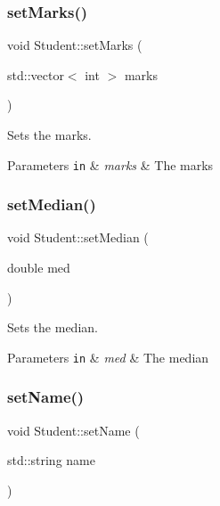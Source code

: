 \subsubsection{\texorpdfstring{set\+Marks()}{setMarks()}}
{\footnotesize\ttfamily void Student\+::set\+Marks (\begin{DoxyParamCaption}\item[{std\+::vector$<$ int $>$}]{marks }\end{DoxyParamCaption})\hspace{0.3cm}{\ttfamily [inline]}}



Sets the marks. 


\begin{DoxyParams}[1]{Parameters}
\mbox{\tt in}  & {\em marks} & The marks \\
\hline
\end{DoxyParams}
\mbox{\label{class_student_a18bd18da05116b937e6ace308da8b8d3}} 
\subsubsection{\texorpdfstring{set\+Median()}{setMedian()}}
{\footnotesize\ttfamily void Student\+::set\+Median (\begin{DoxyParamCaption}\item[{double}]{med }\end{DoxyParamCaption})\hspace{0.3cm}{\ttfamily [inline]}}



Sets the median. 


\begin{DoxyParams}[1]{Parameters}
\mbox{\tt in}  & {\em med} & The median \\
\hline
\end{DoxyParams}
\mbox{\label{class_student_af289cfb2ae8a57077bd91062b9769719}} 
\subsubsection{\texorpdfstring{set\+Name()}{setName()}}
{\footnotesize\ttfamily void Student\+::set\+Name (\begin{DoxyParamCaption}\item[{std\+::string}]{name }\end{DoxyParamCaption})\hspace{0.3cm}{\ttfamily [inline]}}



